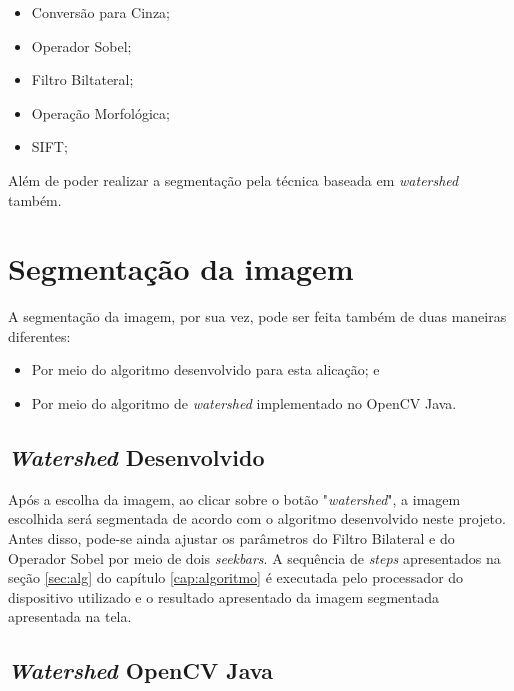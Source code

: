 \begin{itemize}
    \item Conversão para Cinza;
    \item Operador Sobel;
    \item Filtro Biltateral;
    \item Operação Morfológica;
    \item SIFT;
\end{itemize}

Além de poder realizar a segmentação pela técnica baseada em \textit{watershed} também.

\section{Segmentação da imagem}\label{sec:segmentacao_aplicacao}

A segmentação da imagem, por sua vez, pode ser feita também de duas maneiras diferentes:
\begin{itemize}
    \item Por meio do algoritmo desenvolvido para esta alicação; e
    \item Por meio do algoritmo de \textit{watershed} implementado no OpenCV Java.
\end{itemize}

\subsection{\textit{Watershed} Desenvolvido}

Após a escolha da imagem, ao clicar sobre o botão "\textit{watershed}", a imagem escolhida será segmentada de acordo com o algoritmo desenvolvido neste projeto. Antes disso, pode-se ainda ajustar os parâmetros do Filtro Bilateral e do Operador Sobel por meio de dois \textit{seekbars}. A sequência de \textit{steps} apresentados na seção \ref{sec:alg} do capítulo \ref{cap:algoritmo} é executada pelo processador do dispositivo utilizado e o resultado apresentado da imagem segmentada apresentada na tela.  

\subsection{\textit{Watershed} OpenCV Java}


